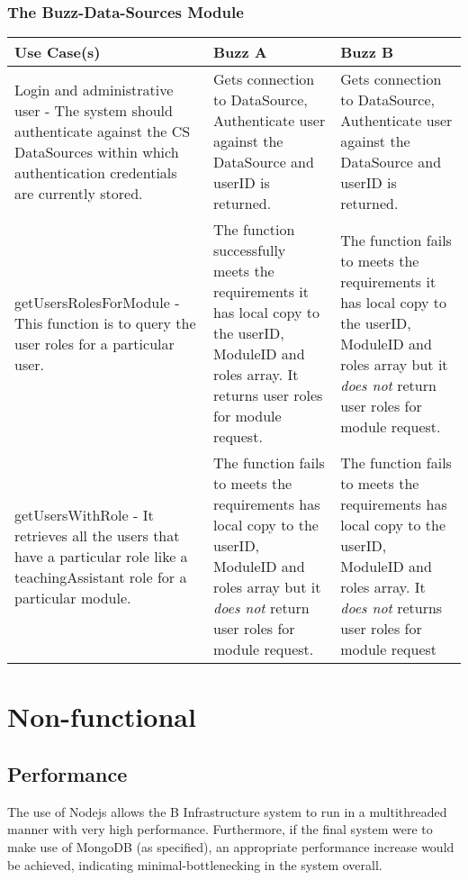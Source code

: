 \documentclass[12pt]{article}
\begin{document}
\subsubsection{The Buzz-Data-Sources Module}%
\begin{tabular}{|p{4.5cm}|p{4.5cm}|p{4.5cm}|}

\hline
Use Case(s) & Buzz A & Buzz B \\ 
\hline
Login and administrative user - The system should authenticate against the CS DataSources within which authentication credentials are currently stored. & Gets connection to DataSource, Authenticate user against the DataSource and userID is returned. & Gets connection to DataSource, Authenticate user against the DataSource and userID is returned.\\ %
\hline
getUsersRolesForModule - This function is to query the user roles for a particular user. & The function successfully meets the requirements it has local copy to the userID, ModuleID and roles array. It returns user roles for module request. &  The function fails to meets the requirements it has local copy to the userID, ModuleID and roles array but it \emph{does not} return user roles for module request.\\ %
\hline
getUsersWithRole - It retrieves all the users that have a particular role like a teachingAssistant role for a particular module. & The function fails to meets the requirements has local copy to the userID, ModuleID and roles array but it \emph{does not} return user roles for module request. & The function fails to meets the requirements has local copy to the userID, ModuleID and roles array. It \emph{does not} returns user roles for module request\\ %
\hline

\end{tabular}


\section{Non-functional} %
\subsection{Performance}
The use of Nodejs allows the B Infrastructure system to run in a multithreaded manner with very high performance. Furthermore, if the final system were to make use of MongoDB (as specified), an appropriate performance increase would be achieved, indicating minimal-bottlenecking in the system overall.
\end{document}
